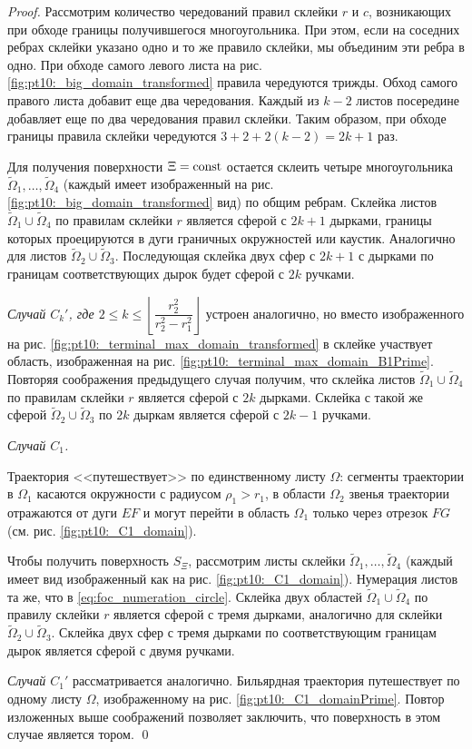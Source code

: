 \begin{proof}
Рассмотрим количество чередований правил склейки $r$ и $c$, возникающих при обходе границы получившегося многоугольника. При этом, если на соседних ребрах склейки указано одно и то же правило склейки, мы объединим эти ребра в одно.
При обходе самого левого листа на рис. \ref{fig:pt10:_big_domain_transformed} правила чередуются трижды. Обход самого правого листа добавит еще два чередования. Каждый из $k-2$ листов посередине добавляет еще по два чередования правил склейки. Таким образом, при обходе границы правила склейки чередуются $3+2+2(k-2) = 2k+1$ раз.

Для получения поверхности $\Xi = \mathrm{const}$ остается склеить четыре многоугольника $\widetilde{\Omega}_1, \ldots, \widetilde{\Omega}_4$ (каждый имеет изображенный на рис. \ref{fig:pt10:_big_domain_transformed} вид) по общим ребрам. 
Склейка листов $\widetilde{\Omega}_1 \cup \widetilde{\Omega}_4$ по правилам склейки $r$ является сферой с $2k+1$ дырками, границы которых проецируются в дуги граничных окружностей или каустик. Аналогично для листов $\widetilde{\Omega}_2 \cup \widetilde{\Omega}_3$. Последующая склейка двух сфер с $2k+1$ с дырками по границам соответствующих дырок будет сферой с $2k$ ручками.

\textit{Случай $C_k'$, где $2 \leq k \leq \left\lfloor \dfrac{r_2^2}{r_2^2-r_1^2} \right\rfloor$} 
устроен аналогично, но вместо  изображенного на рис.    
\ref{fig:pt10:_terminal_max_domain_transformed} в склейке участвует область, изображенная на рис. \ref{fig:pt10:_terminal_max_domain_B1Prime}. Повторяя соображения предыдущего случая получим, что  склейка листов  $\widetilde\Omega_1 \cup \widetilde\Omega_4$ по правилам склейки $r$ является сферой с $2k$ дырками. Склейка с такой же сферой $\widetilde\Omega_2 \cup \widetilde\Omega_3$ по $2k$ дыркам является сферой с $2k-1$ ручками.  

\textit{Случай $C_1$.}

Траектория  <<путешествует>> по единственному листу $\Omega$: сегменты траектории в $\Omega_1$ касаются окружности с радиусом $\rho_1 > r_1$, в области $\Omega_2$ звенья траектории отражаются от дуги $EF$ и  могут перейти в область $\Omega_1$ только через отрезок $FG$ (см. рис. \ref{fig:pt10:_C1_domain}).

Чтобы получить поверхность $S_\Xi$, рассмотрим листы склейки $\widetilde\Omega_1, \ldots, \widetilde\Omega_4$ (каждый имеет вид изображенный как на рис. \ref{fig:pt10:_C1_domain}). Нумерация листов та же, что в \eqref{eq:foc_numeration_circle}. Склейка двух областей $\widetilde{\Omega}_1 \cup \widetilde{\Omega}_4$ по правилу склейки $r$ является сферой с тремя дырками, аналогично для склейки $\widetilde{\Omega}_2 \cup \widetilde{\Omega}_3$. Склейка двух сфер с тремя дырками  по соответствующим границам дырок  является сферой с двумя ручками.

\textit{Случай $C_1'$} рассматривается аналогично. Бильярдная траектория  путешествует по одному листу $\Omega$, изображенному на  рис. \ref{fig:pt10:_C1_domainPrime}. Повтор изложенных выше соображений позволяет заключить, что поверхность в этом случае является тором.
\qed
\end{proof}

